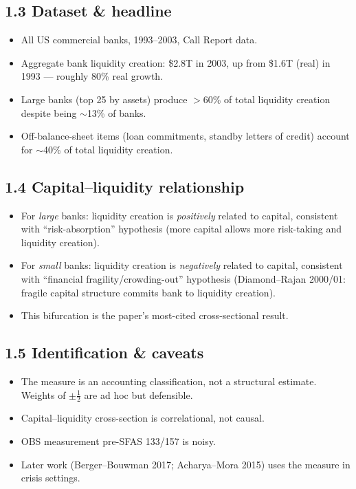 \documentclass[11pt]{article}
\begin{document}
\subsection*{1.3 Dataset \& headline}
\begin{itemize}
\item All US commercial banks, 1993--2003, Call Report data.
\item Aggregate bank liquidity creation: \$2.8T in 2003, up from \$1.6T (real) in 1993 --- roughly 80\% real growth.
\item Large banks (top 25 by assets) produce $>$60\% of total liquidity creation despite being $\sim$13\% of banks.
\item Off-balance-sheet items (loan commitments, standby letters of credit) account for $\sim$40\% of total liquidity creation.
\end{itemize}

\subsection*{1.4 Capital--liquidity relationship}
\begin{itemize}
\item For \emph{large} banks: liquidity creation is \emph{positively} related to capital, consistent with ``risk-absorption'' hypothesis (more capital allows more risk-taking and liquidity creation).
\item For \emph{small} banks: liquidity creation is \emph{negatively} related to capital, consistent with ``financial fragility/crowding-out'' hypothesis (Diamond--Rajan 2000/01: fragile capital structure commits bank to liquidity creation).
\item This bifurcation is the paper's most-cited cross-sectional result.
\end{itemize}

\subsection*{1.5 Identification \& caveats}
\begin{alertbox}
\begin{itemize}
\item The measure is an accounting classification, not a structural estimate. Weights of $\pm\tfrac12$ are ad hoc but defensible.
\item Capital--liquidity cross-section is correlational, not causal.
\item OBS measurement pre-SFAS 133/157 is noisy.
\item Later work (Berger--Bouwman 2017; Acharya--Mora 2015) uses the measure in crisis settings.
\end{itemize}
\end{alertbox}
\end{document}
